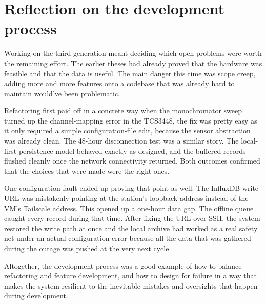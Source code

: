\section{Reflection on the development process}

Working on the third generation meant deciding which open problems were worth the remaining effort. The earlier theses had already proved that the hardware was feasible and that the data is useful. The main danger this time was scope creep, adding more and more features onto a codebase that was already hard to maintain would've been problematic.

Refactoring first paid off in a concrete way when the monochromator sweep turned up the channel-mapping error in the TCS3448, the fix was pretty easy as it only required a simple configuration-file edit, because the sensor abstraction was already clean. The 48-hour disconnection test was a similar story. The local-first persistence model behaved exactly as designed, and the buffered records flushed cleanly once the network connectivity returned. Both outcomes confirmed that the choices that were made were the right ones.

One configuration fault ended up proving that point as well. The InfluxDB write URL was mistakenly pointing at the station's loopback address instead of the VM's Tailscale address. This opened up a one-hour data gap. The offline queue caught every record during that time. After fixing the URL over SSH, the system restored the write path at once and the local archive had worked as a real safety net under an actual configuration error because all the data that was gathered during the outage was pushed at the very next cycle.

Altogether, the development process was a good example of how to balance refactoring and feature development, and how to design for failure in a way that makes the system resilient to the inevitable mistakes and oversights that happen during development.
\endgroup

